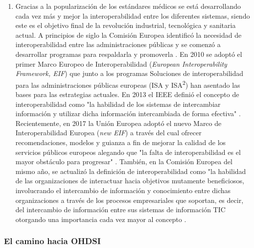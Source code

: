 \begin{enumerate}[label=\alph*.]
    \item  Gracias a la popularización de los estándares médicos se está desarrollando cada vez más y mejor la interoperabilidad entre los diferentes sistemas, siendo este es el objetivo final de la revolución industrial, tecnológica y sanitaria actual. A principios de siglo la Comisión Europea identificó la necesidad de interoperabilidad entre las administraciones públicas y se comenzó a desarrollar programas para respaldarla y promoverla \cite{CEU1999ida}. En 2010 se adoptó el primer Marco Europeo de Interoperabilidad (\textit{European Interoperability Framework, EIF}) que junto a los programas Soluciones de interoperabilidad para las administraciones públicas europeas (ISA y ISA\textsuperscript{2}) han asentado las bases para las estrategias actuales. En 2013 el IEEE definió el concepto de interoperabilidad como "la habilidad de los sistemas de intercambiar información y utilizar dicha información intercambiada de forma efectiva" \cite{berryman2013data}. Recientemente, en 2017 la Unión Europea adoptó el nuevo Marco de Interoperabilidad Europea (\textit{new EIF})  a través del cual ofrecer recomendaciones, modelos y guianza a fin de mejorar la calidad de los servicios públicos europeos alegando que "la falta de interoperabilidad es el mayor obstáculo para progresar" \cite{kouroubali2019new}. También, en la Comisión Europea del mismo año, se actualizó la definición de interoperabilidad como "la habilidad de las organizaciones de interactuar hacia objetivos mutamente beneficiosos, involucrando el intercambio de información y conocimiento entre dichas organizaciones a través de los procesos empresariales que soportan, es decir, del intercambio de información entre sus sistemas de información TIC otorgando una importancia cada vez mayor al concepto \cite{katehakis2019framework}\cite{CEU2017eif} \cite{casiano2022towards}.

\end{enumerate}



\subsubsection{El camino hacia OHDSI}


